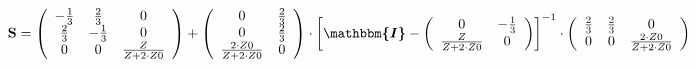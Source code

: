 \[ \mathbf{S} = \left(\begin{array}{ccc} -\frac{1}{3} & \frac{2}{3} &
0 \\ \frac{2}{3} & -\frac{1}{3} & 0 \\ 0 & 0 & \frac{Z}{Z+2\cdot Z0}
\end{array}\right) + \left(\begin{array}{cc} 0 & \frac{2}{3} \\ 0 &
\frac{2}{3} \\ \frac{2\cdot Z0}{Z+2\cdot Z0} & 0 \end{array}\right)
\cdot \left[ \boldsymbol{\mathbbm{I}}  - \left(\begin{array}{cc} 0 &
-\frac{1}{3} \\ \frac{Z}{Z+2\cdot Z0} & 0 \end{array}\right)
\right]^{-1} \cdot\left(\begin{array}{ccc} \frac{2}{3} & \frac{2}{3} &
0 \\ 0 & 0 & \frac{2\cdot Z0}{Z+2\cdot Z0} \end{array}\right) \]
